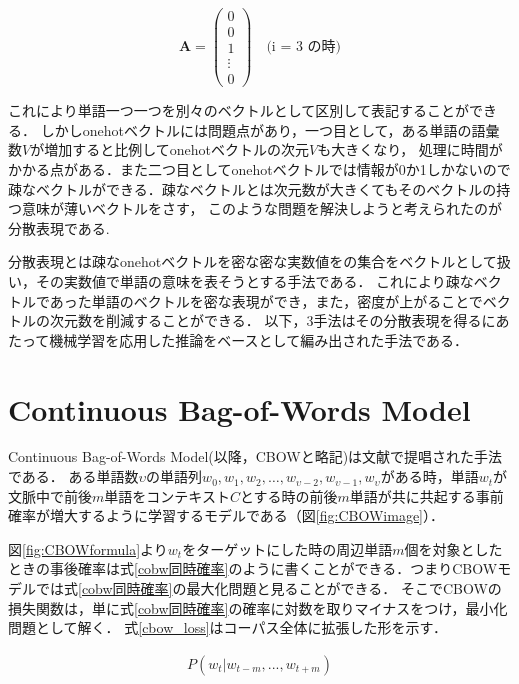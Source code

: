 \documentclass[a4j,11pt,report]{jsbook}
\begin{document}
\begin{equation}
  \label{onehot}
  \bm{A} = \left(
  \begin{array}{c}
    0 \\
    0 \\
    1 \\
    \vdots \\
    0
  \end{array}
  \right)
  \quad \text{(i = 3 の時)}
\end{equation}


これにより単語一つ一つを別々のベクトルとして区別して表記することができる．
しかしonehotベクトルには問題点があり，一つ目として，ある単語の語彙数$V$が増加すると比例してonehotベクトルの次元$V$も大きくなり，
処理に時間がかかる点がある．また二つ目としてonehotベクトルでは情報が0か1しかないので疎なベクトルができる．疎なベクトルとは次元数が大きくてもそのベクトルの持つ意味が薄いベクトルをさす，
このような問題を解決しようと考えられたのが分散表現である.

分散表現とは疎なonehotベクトルを密な密な実数値をの集合をベクトルとして扱い，その実数値で単語の意味を表そうとする手法である．
これにより疎なベクトルであった単語のベクトルを密な表現ができ，また，密度が上がることでベクトルの次元数を削減することができる．
以下，3手法はその分散表現を得るにあたって機械学習を応用した推論をベースとして編み出された手法である．

\clearpage
\section{Continuous Bag-of-Words Model\label{sec:CBOW}}
Continuous Bag-of-Words Model(以降，CBOWと略記)は文献\cite{SkipCBOW}で提唱された手法である．
ある単語数$\upsilon$の単語列$w_{0},w_{1},w_{2},\dots,w_{\upsilon-2},w_{\upsilon-1},w_{\upsilon}$がある時，単語$w_{t}$が文脈中で前後$m$単語をコンテキスト$C$とする時の前後$m$単語が共に共起する事前確率が増大するように学習するモデルである（図\ref{fig:CBOWimage}）．


図\ref{fig:CBOWformula}より$w_{t}$をターゲットにした時の周辺単語$m$個を対象としたときの事後確率は式\ref{cobw同時確率}のように書くことができる．つまりCBOWモデルでは式\ref{cobw同時確率}の最大化問題と見ることができる．
そこでCBOWの損失関数は，単に式\ref{cobw同時確率}の確率に対数を取りマイナスをつけ，最小化問題として解く．
式\ref{cbow_loss}はコーパス全体に拡張した形を示す．



\begin{equation}
  \label{cobw同時確率}
  \begin{array}{c}
    P(w_{t}|w_{t-m},...,w_{t+m})
  \end{array}
\end{equation}
\end{document}
